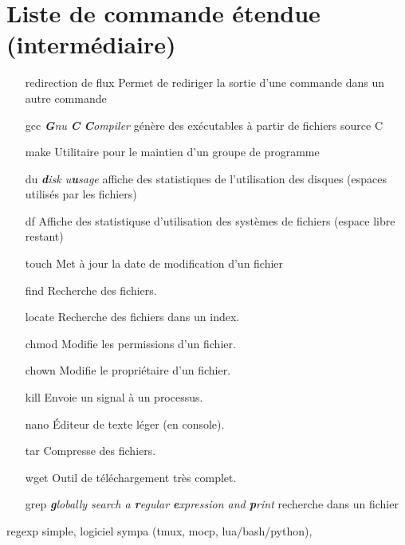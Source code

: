\documentclass[french, a4paper, 12pt, titlepage]{article}
\begin{document}
\section{Liste de commande étendue (intermédiaire)}
\begin{enumerate}
\item[redirection de flux] Permet de rediriger la sortie d'une commande dans un autre commande
\item[gcc] \emph{\textbf{G}nu \textbf{C} \textbf{C}ompiler}  génère des exécutables à partir de fichiers source C
\item[make] Utilitaire pour le maintien d'un groupe de programme
\item[du] \emph{\textbf{d}isk u\textbf{u}sage} affiche des statistiques de l'utilisation des disques (espaces utilisés par les fichiers)
\item[df] Affiche des statistiquse d'utilisation des systèmes de fichiers (espace libre restant)
\item[touch] Met à jour la date de modification d'un fichier
\item[find] Recherche des fichiers.
\item[locate] Recherche des fichiers dans un index.
\item[chmod] Modifie les permissions d'un fichier.
\item[chown] Modifie le propriétaire d'un fichier.
\item[kill] Envoie un signal à un processus.
\item[nano] Éditeur de texte léger (en console).
\item[tar] Compresse des fichiers.
\item[wget] Outil de téléchargement très complet.
\item[grep] \emph{\textbf{g}lobally search a \textbf{r}egular \textbf{e}xpression and \textbf{p}rint} recherche dans un fichier
\end{enumerate}
regexp simple, logiciel sympa (tmux, mocp, lua/bash/python),















\newpage
\end{document}
